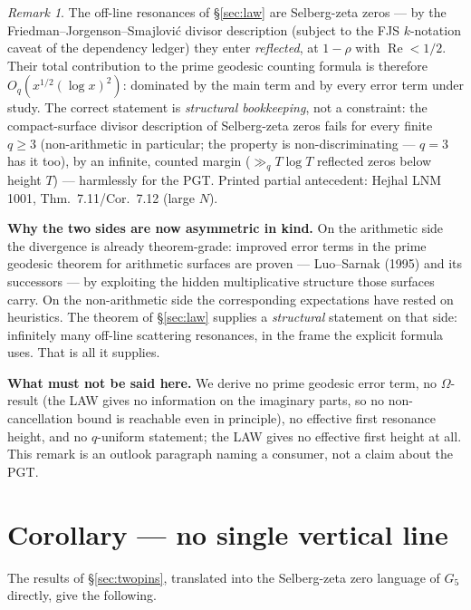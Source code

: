 \documentclass[11pt]{amsart}
\theoremstyle{remark}
\newtheorem*{remark}{Remark}
\begin{document}
\begin{remark}
The off-line resonances of \S\ref{sec:law} are Selberg-zeta zeros --- by
the Friedman--Jorgenson--Smajlovi\'c divisor description (subject to
the FJS $k$-notation caveat of the dependency ledger) they enter
\emph{reflected}, at $1-\rho$ with $\operatorname{Re}<1/2$. Their total
contribution to the prime geodesic counting formula is therefore
$O_q(x^{1/2}(\log x)^2)$: dominated by the main term and by every error
term under study. The correct statement is \emph{structural
bookkeeping}, not a constraint: the compact-surface divisor description
of Selberg-zeta zeros fails for every finite $q\ge 3$ (non-arithmetic in
particular; the property is non-discriminating --- $q=3$ has it too), by
an infinite, counted margin ($\gg_q T\log T$ reflected zeros below
height $T$) --- harmlessly for the PGT. Printed partial antecedent:
Hejhal LNM 1001, Thm.\ 7.11/Cor.\ 7.12 (large $N$).
\end{remark}

\textbf{Why the two sides are now asymmetric in kind.} On the
arithmetic side the divergence is already theorem-grade: improved error
terms in the prime geodesic theorem for arithmetic surfaces are proven
--- Luo--Sarnak (1995) \cite{LuoSarnak1995} and its successors --- by
exploiting the hidden multiplicative structure those surfaces carry. On
the non-arithmetic side the corresponding expectations have rested on
heuristics. The theorem of \S\ref{sec:law} supplies a \emph{structural}
statement on that side: infinitely many off-line scattering resonances,
in the frame the explicit formula uses. That is all it supplies.

\textbf{What must not be said here.} We derive no prime geodesic error
term, no $\Omega$-result (the LAW gives no information on the imaginary
parts, so no non-cancellation bound is reachable even in principle), no
effective first resonance height, and no $q$-uniform statement; the LAW
gives no effective first height at all. This remark is an outlook
paragraph naming a consumer, not a claim about the PGT.

\section{Corollary --- no single vertical line}

The results of \S\ref{sec:twopins}, translated into the Selberg-zeta
zero language of $G_5$ directly, give the following.
\end{document}
